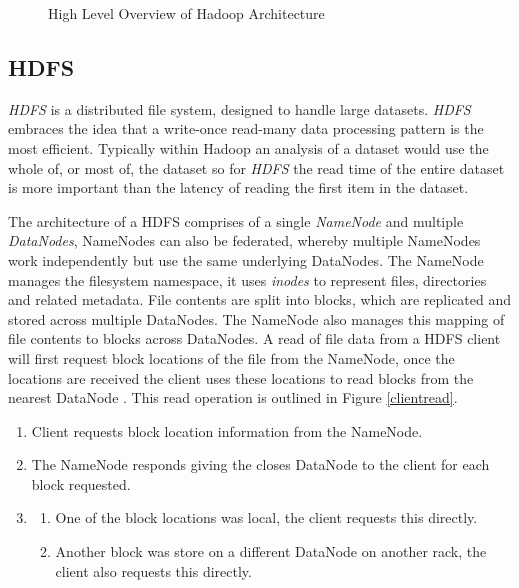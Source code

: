 \documentclass[conference]{IEEEtran}
\begin{document}
\begin{figure}[ht]
\centering
{}
\caption{High Level Overview of Hadoop Architecture}
\label{highlevelarch}
\end{figure}

\subsection{HDFS}
\emph{HDFS} is a distributed file system, designed to handle large datasets. \emph{HDFS} embraces the idea that a write-once read-many data processing pattern is the most efficient. Typically within Hadoop an analysis of a dataset would use the whole of, or most of, the dataset so for \emph{HDFS} the read time of the entire dataset is more important than the latency of reading the first item in the dataset. 

The architecture of a HDFS comprises of a single \emph{NameNode} and multiple \emph{DataNodes}, NameNodes can also be federated, whereby multiple NameNodes work independently but use the same underlying DataNodes. The NameNode manages the filesystem namespace, it uses \emph{inodes} to represent files, directories and related metadata. File contents are split into blocks, which are replicated and stored across multiple DataNodes. The NameNode also manages this mapping of file contents to blocks across DataNodes. A read of file data from a HDFS client will first request block locations of the file from the NameNode, once the locations are received the client uses these locations to read blocks from the nearest DataNode \cite{hdfs}. This read operation is outlined in Figure \ref{clientread}.

\begin{enumerate}
\item Client requests block location information from the NameNode.
\item The NameNode responds giving the closes DataNode to the client for each block requested.
	\item \begin{enumerate}
     \item One of the block locations was local, the client requests this directly.
     \item Another block was store on a different DataNode on another rack, the client also requests this directly.
   \end{enumerate}
\end{enumerate}
\end{document}
